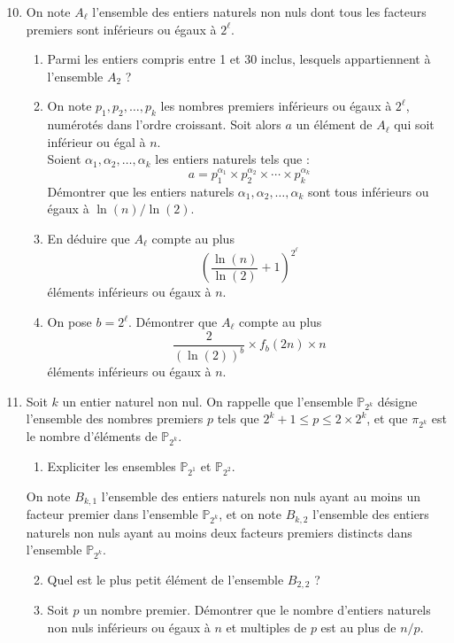 \documentclass[landscape,twocolumn,leqno,a4paper,10pt]{report} %
\renewcommand{\leq}{\leqslant}
\begin{document}
\begin{enumerate}\setcounter{enumi}{9}
	\item On note $A_{\ell}$ l'ensemble des entiers naturels non nuls dont tous les facteurs premiers sont inférieurs ou égaux à $2^{\ell}$.
	\begin{enumerate}
		\item Parmi les entiers compris entre 1 et 30 inclus, lesquels appartiennent à l'ensemble $A_{2}$ ?
		\item On note $p_{1}, p_{2}, \ldots, p_{k}$ les nombres premiers inférieurs ou égaux à $2^{\ell}$, numérotés dans l'ordre croissant. Soit alors $a$ un élément de $A_{\ell}$ qui soit inférieur ou égal à $n$.\\
		Soient $\alpha_{1}, \alpha_{2}, \ldots, \alpha_{k}$ les entiers naturels tels que :
		$$a=p_{1}^{\alpha_{1}} \times p_{2}^{\alpha_{2}} \times \cdots \times p_{k}^{\alpha_{k}}$$
		Démontrer que les entiers naturels $\alpha_{1}, \alpha_{2}, \ldots, \alpha_{k}$ sont tous inférieurs ou égaux à $\ln (n) / \ln (2)$.
		\item En déduire que $A_{\ell}$ compte au plus
		$$\left(\frac{\ln (n)}{\ln (2)}+1\right)^{2^{\ell}}$$
		éléments inférieurs ou égaux à $n$.
		\item On pose $b=2^{\ell}$. Démontrer que $A_{\ell}$ compte au plus
		$$\frac{2}{(\ln (2))^{b}} \times f_{b}(2 n) \times n$$
		éléments inférieurs ou égaux à $n$.
	\end{enumerate}
	\item Soit $k$ un entier naturel non nul. On rappelle que l'ensemble $\mathbb{P}_{2^k}$ désigne l'ensemble des nombres premiers $p$ tels que $2^{k}+1 \leq p \leq 2 \times 2^{k}$, et que $\pi_{2^{k}}$ est le nombre d'éléments de $\mathbb{P}_{2^{k}}$.
	\begin{enumerate}
		\item Expliciter les ensembles $\mathbb{P}_{2^{1}}$ et $\mathbb{P}_{2^{2}}$.
	\end{enumerate}
	On note $B_{k, 1}$ l'ensemble des entiers naturels non nuls ayant au moins un facteur premier dans l'ensemble $\mathbb{P}_{2^{k}}$, et on note $B_{k, 2}$ l'ensemble des entiers naturels non nuls ayant au moins deux facteurs premiers distincts dans l'ensemble $\mathbb{P}_{2^{k}}$.
	\begin{enumerate}\setcounter{enumii}{1}
		\item Quel est le plus petit élément de l'ensemble $B_{2,2}$ ?
		\item Soit $p$ un nombre premier. Démontrer que le nombre d'entiers naturels non nuls inférieurs ou égaux à $n$ et multiples de $p$ est au plus de $n / p$.

\end{enumerate}
\end{enumerate}
\end{document}
